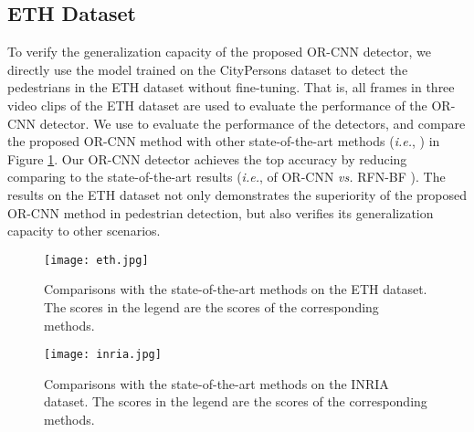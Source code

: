 \documentclass[runningheads]{llncs}
\def\ie{{\em i.e.}}
\begin{document}
\subsection{ETH Dataset}
To verify the generalization capacity of the proposed OR-CNN detector, we directly use the model trained on the CityPersons \cite{DBLP:conf/cvpr/ZhangBS17} dataset to detect the pedestrians in the ETH dataset \cite{DBLP:conf/iccv/EssLG07} without fine-tuning. That is, all  frames in three video clips of the ETH dataset \cite{DBLP:conf/iccv/EssLG07} are used to evaluate the performance of the OR-CNN detector. We use  to evaluate the performance of the detectors, and compare the proposed OR-CNN method with other state-of-the-art methods (\ie, \cite{DBLP:conf/cvpr/DalalT05,DBLP:journals/ijcv/ViolaJ04,DBLP:conf/cvpr/BenensonMTG13,DBLP:conf/eccv/PaisitkriangkraiSH14,DBLP:conf/cvpr/TianLWT15,DBLP:conf/eccv/ZhangLLH16,DBLP:conf/cvpr/OuyangW12,DBLP:conf/iccv/OuyangW13,DBLP:conf/iccv/MathiasBTG13,DBLP:journals/ijcv/ShenWPH13,DBLP:conf/cvpr/OuyangZW13,DBLP:conf/iccv/MarinVLAL13,DBLP:conf/nips/NamDH14,DBLP:conf/cvpr/LuoTWT14}) in Figure \ref{fig:eth}. Our OR-CNN detector achieves the top accuracy by reducing   comparing to the state-of-the-art results (\ie,  of OR-CNN {\em vs.}  RFN-BF \cite{DBLP:conf/eccv/ZhangLLH16}). The results on the ETH dataset not only demonstrates the superiority of the proposed OR-CNN method in pedestrian detection, but also verifies its generalization capacity to other scenarios.

\begin{figure}[t] \centering
\texttt{[image: eth.jpg]}
\caption{Comparisons with the state-of-the-art methods on the ETH dataset. The scores in the legend are the  scores of the corresponding methods.}
\label{fig:eth}
\end{figure}

\begin{figure}[t]
\centering
\texttt{[image: inria.jpg]}
\caption{Comparisons with the state-of-the-art methods on the INRIA dataset. The scores in the legend are the  scores of the corresponding methods.}
\label{fig:inria}
\end{figure}
\end{document}

